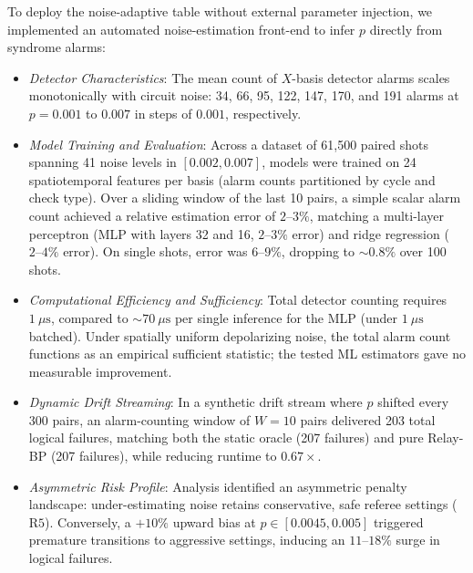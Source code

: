 To deploy the noise-adaptive table without external parameter injection, we implemented an automated noise-estimation front-end to infer $p$ directly from syndrome alarms:
\begin{itemize}
    \item \textit{Detector Characteristics}: The mean count of $X$-basis detector alarms scales monotonically with circuit noise: 34, 66, 95, 122, 147, 170, and 191 alarms at $p = 0.001$ to $0.007$ in steps of $0.001$, respectively.
    \item \textit{Model Training and Evaluation}: Across a dataset of 61,500 paired shots spanning 41 noise levels in $[0.002, 0.007]$, models were trained on 24 spatiotemporal features per basis (alarm counts partitioned by cycle and check type). Over a sliding window of the last 10 pairs, a simple scalar alarm count achieved a relative estimation error of $2\text{--}3\%$, matching a multi-layer perceptron (MLP with layers 32 and 16, $2\text{--}3\%$ error) and ridge regression ($2\text{--}4\%$ error). On single shots, error was $6\text{--}9\%$, dropping to $\sim 0.8\%$ over 100 shots.
    \item \textit{Computational Efficiency and Sufficiency}: Total detector counting requires $1\ \mu\text{s}$, compared to $\sim 70\ \mu\text{s}$ per single inference for the MLP (under $1\ \mu\text{s}$ batched). Under spatially uniform depolarizing noise, the total alarm count functions as an empirical sufficient statistic; the tested ML estimators gave no measurable improvement.
    \item \textit{Dynamic Drift Streaming}: In a synthetic drift stream where $p$ shifted every 300 pairs, an alarm-counting window of $W = 10$ pairs delivered 203 total logical failures, matching both the static oracle (207 failures) and pure Relay-BP (207 failures), while reducing runtime to $0.67\times$.
    \item \textit{Asymmetric Risk Profile}: Analysis identified an asymmetric penalty landscape: under-estimating noise retains conservative, safe referee settings ($\text{R5}$). Conversely, a $+10\%$ upward bias at $p \in [0.0045, 0.005]$ triggered premature transitions to aggressive settings, inducing an $11\text{--}18\%$ surge in logical failures.
\end{itemize}
